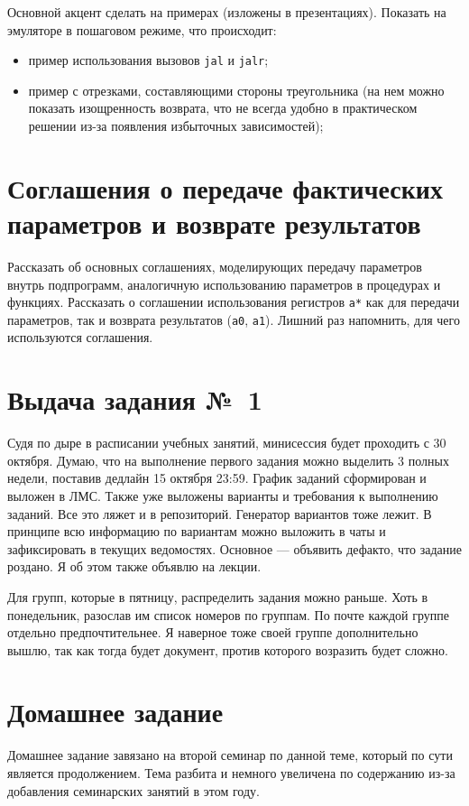 Основной акцент сделать на примерах (изложены в презентациях). Показать на эмуляторе в пошаговом режиме, что происходит:
\begin{itemize}
    \item пример использования вызовов \verb|jal|  и \verb|jalr|;
    \item пример с отрезками, составляющими стороны треугольника (на нем можно показать изощренность возврата, что не всегда удобно в практическом решении из-за появления избыточных зависимостей);
\end{itemize}

\section{Соглашения о передаче фактических параметров и возврате результатов}

Рассказать об основных соглашениях, моделирующих передачу параметров внутрь подпрограмм, аналогичную использованию параметров в процедурах и функциях. Рассказать о соглашении использования регистров \verb|a*| как для передачи параметров, так и возврата результатов (\verb|a0|, \verb|a1|). Лишний раз напомнить, для чего используются соглашения.

\section{Выдача задания №~1}

Судя по дыре в расписании учебных занятий, минисессия будет проходить с 30 октября. Думаю, что на выполнение первого задания можно выделить 3 полных недели, поставив дедлайн 15 октября 23:59. График заданий сформирован и выложен в ЛМС. Также уже выложены варианты и требования к выполнению заданий. Все это ляжет и в репозиторий. Генератор вариантов тоже лежит. В принципе всю информацию по вариантам можно выложить в чаты и зафиксировать в текущих ведомостях. Основное --- объявить дефакто, что задание роздано. Я об этом также объявлю на лекции.

Для групп, которые в пятницу, распределить задания можно раньше. Хоть в понедельник, разослав им список номеров по группам. По почте каждой группе отдельно предпочтительнее. Я наверное тоже своей группе дополнительно вышлю, так как тогда будет документ, против которого возразить будет сложно.

\section{Домашнее задание}

Домашнее задание завязано на второй семинар по данной теме, который по сути является продолжением. Тема разбита и немного увеличена по содержанию из-за добавления семинарских занятий в этом году.
